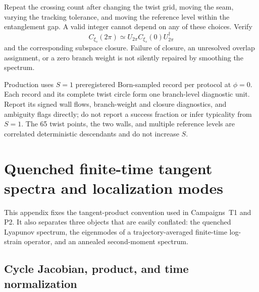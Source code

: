 \documentclass[aps,prx,twocolumn,floatfix,nofootinbib,superscriptaddress,longbibliography]{revtex4-2}
\begin{document}
Repeat the crossing count after changing the twist grid, moving the seam, varying the
tracking tolerance, and moving the reference level within the entanglement gap.  A valid
integer cannot depend on any of these choices.  Verify
\begin{equation}
 C_{\xi_s}(2\pi)
 \simeq U_{2\pi}C_{\xi_s}(0)U_{2\pi}^\dagger
 \label{eq:frozen-record-closure}
\end{equation}
and the corresponding subspace closure.  Failure of closure, an unresolved overlap
assignment, or a zero branch weight is not silently repaired by smoothing the spectrum.

Production uses $S=1$ preregistered Born-sampled record per protocol at $\phi=0$.  Each
record and its complete twist circle form one branch-level diagnostic unit.  Report its
signed wall flows, branch-weight and closure diagnostics, and ambiguity flags directly;
do not report a success fraction or infer typicality from $S=1$.  The 65 twist points, the
two walls, and multiple reference levels are correlated deterministic descendants and do
not increase $S$.

\section{Quenched finite-time tangent spectra and localization modes}
\label{app:quenched-tangent}

This appendix fixes the tangent-product convention used in Campaigns~T1 and P2.  It also
separates three objects that are easily conflated: the quenched Lyapunov spectrum, the
eigenmodes of a trajectory-averaged finite-time log-strain operator, and an annealed
second-moment spectrum.

\subsection{Cycle Jacobian, product, and time normalization}
\end{document}
